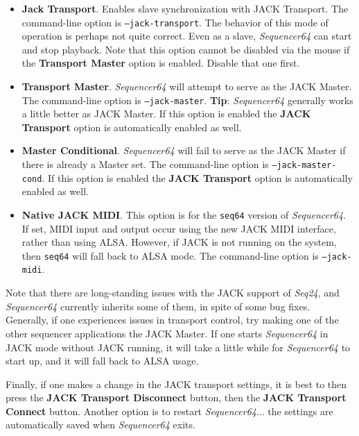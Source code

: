    \begin{itemize}
      \item \textbf{Jack Transport}.
         Enables slave synchronization with JACK Transport.
         The command-line option is \texttt{--jack-transport}.
         The behavior of this mode of operation is perhaps not quite
         correct.  Even as a slave, \textsl{Sequencer64} can start and
         stop playback.
         Note that this option cannot be disabled via the mouse if the
         \textbf{Transport Master} option is enabled.  Disable that one first.
      \item \textbf{Transport Master}.
         \textsl{Sequencer64} will attempt to serve as the JACK Master.
         The command-line option is \texttt{--jack-master}.
         \textbf{Tip}:
         \textsl{Sequencer64} generally works a little better as JACK Master.
         If this option is enabled the \textbf{JACK Transport} option is
         automatically enabled as well.
      \item \textbf{Master Conditional}.
         \textsl{Sequencer64} will fail to serve as the JACK Master if there is
         already a Master set.
         The command-line option is \texttt{--jack-master-cond}.
         If this option is enabled the \textbf{JACK Transport} option is
         automatically enabled as well.
      \item \textbf{Native JACK MIDI}.
         This option is for the \texttt{seq64} version of
         \textsl{Sequencer64}.
         If set, MIDI input and output occur using the new JACK MIDI interface,
         rather than using ALSA.  However, if JACK is not running on the
         system, then \texttt{seq64} will fall back to ALSA mode.
         The command-line option is \texttt{--jack-midi}.
   \end{itemize}

   Note that there are long-standing issues with the JACK support of
   \textsl{Seq24}, and \textsl{Sequencer64} currently inherits some of them,
   in spite of some bug fixes.  Generally, if one experiences issues in
   transport control, try making one of the other sequencer applications the
   JACK Master.
   If one starts \textsl{Sequencer64} in JACK mode without JACK running,
   it will take a little while for \textsl{Sequencer64} to start up, and it
   will fall back to ALSA usage.

   Finally, if one makes a change in the JACK transport settings, it is best to
   then press the \textbf{JACK Transport Disconnect} button, then the
   \textbf{JACK Transport Connect} button.  Another option is to restart
   \textsl{Sequencer64}... the settings are automatically saved when
   \textsl{Sequencer64} exits.

